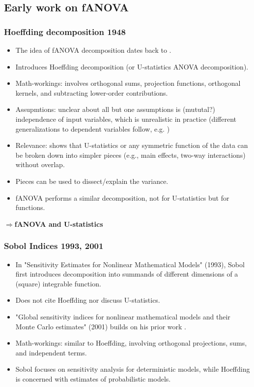 
\subsection*{Early work on fANOVA}
\subsubsection*{Hoeffding decomposition 1948}
\begin{itemize}
    \item The idea of fANOVA decomposition dates back to \cite{hoeffding_class_1948}.
    \item Introduces Hoeffding decomposition (or U-statistics ANOVA decomposition).
    \item Math-workings: involves orthogonal sums, projection functions, orthogonal kernels, and subtracting lower-order contributions.
    \item Assupmtions: unclear about all but one assumptions is (mututal?) independence of input variables, which is unrealistic in practice (different generalizations to dependent variables follow, e.g. \cite{il_idrissi_hoeffding_2025})
    \item Relevance: shows that U-statistics or any symmetric function of the data can be broken down into simpler pieces (e.g., main effects, two-way interactions) without overlap.
    \item Pieces can be used to dissect/explain the variance.
    \item fANOVA performs a similar decomposition, not for U-statistics but for functions.
\end{itemize}
$\Rightarrow$\textbf{fANOVA and U-statistics}

\subsubsection*{Sobol Indices 1993, 2001}
\begin{itemize}
    \item In "Sensitivity Estimates for Nonlinear Mathematical Models" (1993), Sobol first introduces decomposition into summands of different dimensions of a (square) integrable function.
    \item Does not cite Hoeffding nor discuss U-statistics.
    \item "Global sensitivity indices for nonlinear mathematical models and their Monte Carlo estimates" (2001) builds on his prior work \citep{sobol_global_2001}.
    \item Math-workings: similar to Hoeffding, involving orthogonal projections, sums, and independent terms.
    \item Sobol focuses on sensitivity analysis for deterministic models, while Hoeffding is concerned with estimates of probabilistic models.
\end{itemize}

